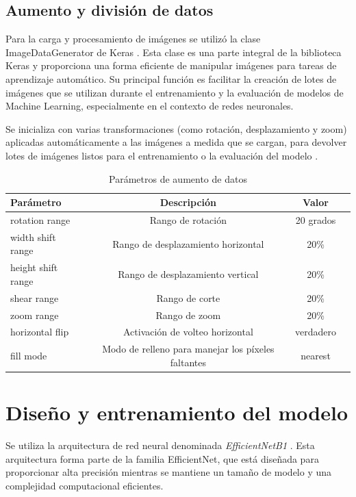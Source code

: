 \subsection{Aumento y división de datos}

Para la carga y procesamiento de imágenes se utilizó la clase ImageDataGenerator de Keras . Esta clase es una parte integral de la biblioteca Keras y proporciona una forma eficiente de manipular imágenes para tareas de aprendizaje automático. Su principal función es facilitar la creación de lotes de imágenes que se utilizan durante el entrenamiento y la evaluación de modelos de Machine Learning, especialmente en el contexto de redes neuronales. 

Se inicializa con varias transformaciones (como rotación, desplazamiento y zoom) aplicadas automáticamente a las imágenes a medida que se cargan, para devolver lotes de imágenes listos para el entrenamiento o la evaluación del modelo .

\begin{table}[ht]
   \centering
   \begin{tabular}{lccc}
   \hline
   Parámetro & Descripción  & Valor \\ \hline
   rotation range & 	Rango de rotación & 20 grados \\
   width shift range & Rango de desplazamiento horizontal & 20\% \\
   height shift range & Rango de desplazamiento vertical & 20\% \\
   shear range & 	Rango de corte & 20\% \\
   zoom range & Rango de zoom & 20\% \\
   horizontal flip & Activación de volteo horizontal & verdadero \\
   fill mode & Modo de relleno para manejar los píxeles faltantes & nearest \\ \hline
   \end{tabular}
   \caption{Parámetros de aumento de datos}
   \label{tab:data_augmentation_params}
   \end{table}

\section{Diseño y entrenamiento del modelo}

Se utiliza la arquitectura de red neural denominada \textit{EfficientNetB1} . Esta arquitectura forma parte de la familia EfficientNet, que está diseñada para proporcionar alta precisión mientras se mantiene un tamaño de modelo y una complejidad computacional eficientes.

